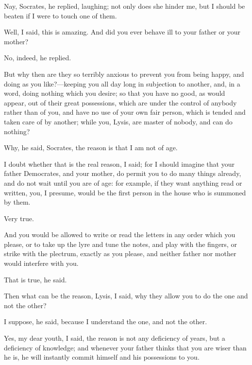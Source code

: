 \documentclass[11pt,letter]{article}
\begin{document}
\par  Nay, Socrates, he replied, laughing; not only does she hinder me, but I should be beaten if I were to touch one of them.

\par  Well, I said, this is amazing. And did you ever behave ill to your father or your mother?

\par  No, indeed, he replied.

\par  But why then are they so terribly anxious to prevent you from being happy, and doing as you like?—keeping you all day long in subjection to another, and, in a word, doing nothing which you desire; so that you have no good, as would appear, out of their great possessions, which are under the control of anybody rather than of you, and have no use of your own fair person, which is tended and taken care of by another; while you, Lysis, are master of nobody, and can do nothing?

\par  Why, he said, Socrates, the reason is that I am not of age.

\par  I doubt whether that is the real reason, I said; for I should imagine that your father Democrates, and your mother, do permit you to do many things already, and do not wait until you are of age: for example, if they want anything read or written, you, I presume, would be the first person in the house who is summoned by them.

\par  Very true.

\par  And you would be allowed to write or read the letters in any order which you please, or to take up the lyre and tune the notes, and play with the fingers, or strike with the plectrum, exactly as you please, and neither father nor mother would interfere with you.

\par  That is true, he said.

\par  Then what can be the reason, Lysis, I said, why they allow you to do the one and not the other?

\par  I suppose, he said, because I understand the one, and not the other.

\par  Yes, my dear youth, I said, the reason is not any deficiency of years, but a deficiency of knowledge; and whenever your father thinks that you are wiser than he is, he will instantly commit himself and his possessions to you.
\end{document}
